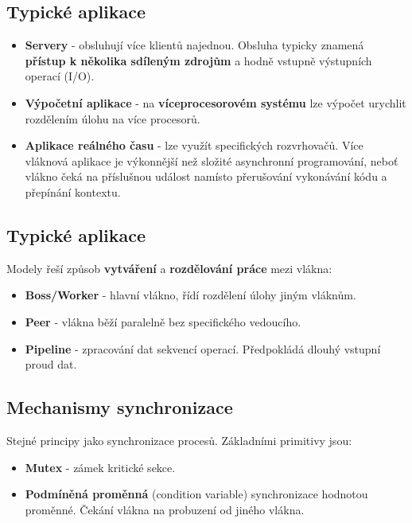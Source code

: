\subsection{Typické aplikace}
\begin{itemize}
	\item \textbf{Servery} - obsluhují více klientů najednou. Obsluha typicky znamená \textbf{přístup k několika sdíleným zdrojům} a hodně vstupně výstupních operací (I/O).
	\item \textbf{Výpočetní aplikace} - na \textbf{víceprocesorovém systému} lze výpočet urychlit rozdělením úlohu na více procesorů.
	\item \textbf{Aplikace reálného času} - lze využít specifických rozvrhovačů. Více vláknová aplikace je výkonnější než složité asynchronní programování, neboť vlákno čeká na příslušnou událost namísto přerušování vykonávání kódu a přepínání kontextu.
\end{itemize}

\subsection{Typické aplikace}
Modely řeší způsob \textbf{vytváření} a \textbf{rozdělování práce} mezi vlákna:
\begin{itemize}
	\item \textbf{Boss/Worker} - hlavní vlákno, řídí rozdělení úlohy jiným vláknům.
	\item \textbf{Peer} - vlákna běží paralelně bez specifického vedoucího.
	\item \textbf{Pipeline} - zpracování dat sekvencí operací. Předpokládá dlouhý vstupní proud dat.
\end{itemize}

\subsection{Mechanismy synchronizace}
Stejné principy jako synchronizace procesů. Základními primitivy jsou:
\begin{itemize}
	\item \textbf{Mutex} - zámek kritické sekce.
	\item \textbf{Podmíněná proměnná} (condition variable) synchronizace hodnotou proměnné. Čekání vlákna na probuzení od jiného vlákna.
\end{itemize}

